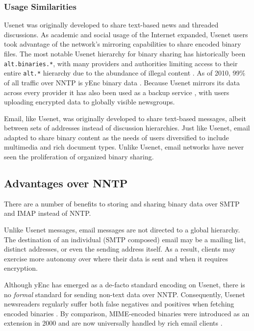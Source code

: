 \documentclass[12pt]{article}
\begin{document}
\subsubsection{Usage Similarities}

Usenet was originally developed to share text-based news and threaded
discussions. As academic and social usage of the Internet expanded,
Usenet users took advantage of the network's mirroring capabilities to share
encoded binary files. The most notable Usenet hierarchy for binary sharing
has historically been \texttt{alt.binaries.*}, with many providers and
authorities limiting access to their entire \texttt{alt.*} hierarchy due to the
abundance of illegal content \cite{cnet2008:01, cnet2008:02}. As of 2010,
99\% of all traffic over NNTP is yEnc binary data \cite{gi2010}.
Because Usenet mirrors its data across every provider it has
also been used as a backup service \cite{ubackup}, with users uploading
encrypted data to globally visible newsgroups.

Email, like Usenet, was originally developed to share text-based messages,
albeit between sets of addresses instead of discussion hierarchies.
Just like Usenet, email adapted to share binary content as the needs of users
diversified to include multimedia and rich document types. Unlike Usenet, email
networks have never seen the proliferation of organized binary sharing.

\subsection{Advantages over NNTP}

There are a number of benefits to storing and sharing binary data over SMTP
and IMAP instead of NNTP.

Unlike Usenet messages, email messages are not directed to a global hierarchy.
The destination of an individual (SMTP composed) email may be a mailing list,
 distinct addresses, or even the sending address itself. As a result, clients
may exercise more autonomy over where their data is sent and when it requires
encryption.

Although yEnc has emerged as a de-facto standard \cite{gi2010} encoding on
Usenet, there is no \textit{formal} standard for sending non-text data over
NNTP. Consequently, Usenet newsreaders regularly suffer both false negatives
and positives when fetching encoded binaries \cite{claus2002, nixon2002}. By
comparison, MIME-encoded binaries were introduced as an extension in 2000 and
are now universally handled by rich email clients \cite{rfc3030}.
\end{document}
